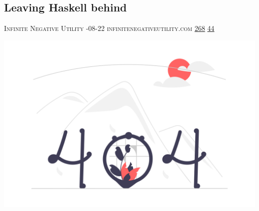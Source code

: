 \documentclass[10pt,a4paper]{article}
\begin{document}
\begin{multicols*}{2}
\begin{minipage}{\linewidth}
\subsection{Leaving Haskell behind}
\textsc{\footnotesize
{\scriptsize\faUser}\space 
Infinite Negative Utility 
{\scriptsize\faCalendar}-08-22 
{\scriptsize\faGlobe}\space 
infinitenegativeutility.com 
{\scriptsize\faThumbsOUp}\space 
\href{http://news.ycombinator.com/item?id=37246932\&utm\_term=comment}{268} 
{\scriptsize\faComments}\space 
\href{http://news.ycombinator.com/item?id=37246932\&utm\_term=comment}{44} 
}
\par\medskip\noindent
\href{https://journal.infinitenegativeutility.com/leaving-haskell-behind?utm\_source=hackernewsletter\&utm\_medium=email\&utm\_term=code}{
    \includegraphics[width=0.99\linewidth]{notfound.png}
}
\end{minipage}

\end{multicols*}
\end{document}
